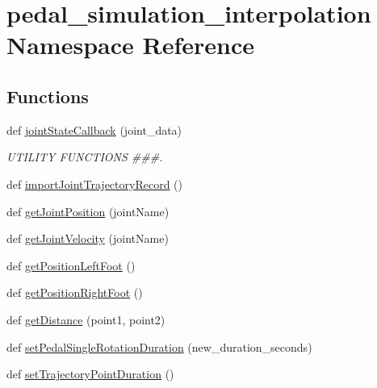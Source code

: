 \hypertarget{namespacepedal__simulation__interpolation}{}\section{pedal\+\_\+simulation\+\_\+interpolation Namespace Reference}
\label{namespacepedal__simulation__interpolation}
\subsection*{Functions}
\begin{DoxyCompactItemize}
\item 
def \mbox{\hyperlink{namespacepedal__simulation__interpolation_a49fea9cbcb3bf9cb0088274b11a26a7f}{joint\+State\+Callback}} (joint\+\_\+data)
\begin{DoxyCompactList}\small\item\em U\+T\+I\+L\+I\+TY F\+U\+N\+C\+T\+I\+O\+NS \#\#\#. \end{DoxyCompactList}\item 
def \mbox{\hyperlink{namespacepedal__simulation__interpolation_aee163628679924e472d4d4ae9e240a91}{import\+Joint\+Trajectory\+Record}} ()
\item 
def \mbox{\hyperlink{namespacepedal__simulation__interpolation_a92cb5dea6e367b38c4f8d08c228f41b2}{get\+Joint\+Position}} (joint\+Name)
\item 
def \mbox{\hyperlink{namespacepedal__simulation__interpolation_accf21dceba504fa9d43cb7b48b170f02}{get\+Joint\+Velocity}} (joint\+Name)
\item 
def \mbox{\hyperlink{namespacepedal__simulation__interpolation_aa1f688695157b0f6b6a1543fe05fc255}{get\+Position\+Left\+Foot}} ()
\item 
def \mbox{\hyperlink{namespacepedal__simulation__interpolation_a831e20e1b88e54ec3a0cc67a7e080dd7}{get\+Position\+Right\+Foot}} ()
\item 
def \mbox{\hyperlink{namespacepedal__simulation__interpolation_ac630778cf91a05322937d4b75576bd87}{get\+Distance}} (point1, point2)
\item 
def \mbox{\hyperlink{namespacepedal__simulation__interpolation_a4c17d0760828bac69bba3e8727c3177c}{set\+Pedal\+Single\+Rotation\+Duration}} (new\+\_\+duration\+\_\+seconds)
\item 
def \mbox{\hyperlink{namespacepedal__simulation__interpolation_a5008bce6451f3c4435b9c4634149acde}{set\+Trajectory\+Point\+Duration}} ()
\item 

\end{DoxyCompactItemize}
